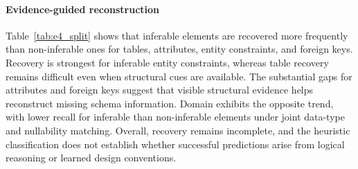 
% 
% 


\paragraph{Evidence-guided reconstruction}
Table~\ref{tab:e4_split} shows that inferable elements are recovered more frequently than non-inferable ones for tables, attributes, entity constraints, and foreign keys. Recovery is strongest for inferable entity constraints, whereas table recovery remains difficult even when structural cues are available. The substantial gaps for attributes and foreign keys suggest that visible structural evidence helps reconstruct missing schema information. Domain exhibits the opposite trend, with lower recall for inferable than non-inferable elements under joint data-type and nullability matching. Overall, recovery remains incomplete, and the heuristic classification does not establish whether successful predictions arise from logical reasoning or learned design conventions.

